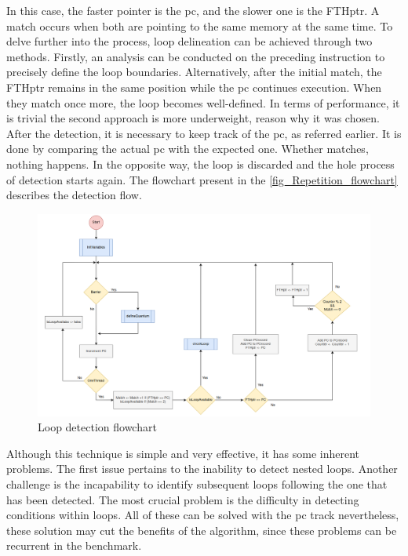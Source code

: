 In this case, the faster pointer is the \gls{pc}, and the slower one is the FTHptr. A match occurs when both are pointing to the same memory at the same time. To delve further into the process, loop delineation can be achieved through two methods. Firstly, an analysis can be conducted on the preceding instruction to precisely define the loop boundaries. Alternatively, after the initial match, the FTHptr remains in the same position while the \gls{pc} continues execution. When they match once more, the loop becomes well-defined. In terms of performance, it is trivial the second approach is more underweight, reason why it was chosen. After the detection, it is necessary to keep track of the \gls{pc}, as referred earlier. It is done by comparing the actual \gls{pc} with the expected one. Whether matches, nothing happens. In the opposite way, the loop is discarded and the hole process of detection starts again. The flowchart present in the \autoref{fig_Repetition_flowchart} describes the detection flow. 

\begin{figure}[h!]
	\centering
 	\includegraphics[width=1\linewidth]{Images/Repetition_flowchart.png}
 	\caption{Loop detection flowchart}
	 \label{fig_Repetition_flowchart}
\end{figure}


Although this technique is simple and very effective, it has some inherent problems. The first issue pertains to the inability to detect nested loops. Another challenge is the incapability to identify subsequent loops following the one that has been detected. The most crucial problem is the difficulty in detecting conditions within loops. All of these can be solved with the \gls{pc} track nevertheless, these solution may cut the benefits of the algorithm, since these problems can be recurrent in the benchmark. 

